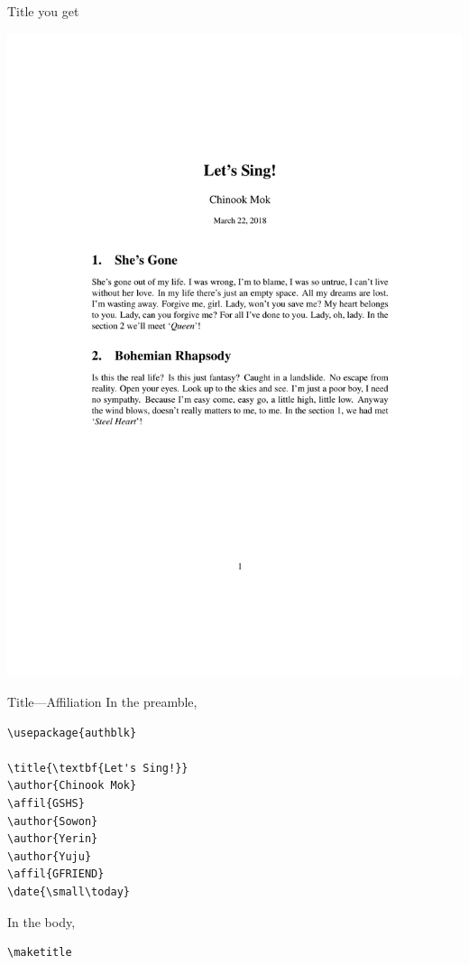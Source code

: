 \documentclass[12pt]{gshs_lecture}
\begin{document}
\begin{frame}[t]{Title}\small
you get
\begin{center}
\begin{framed}
\includegraphics[width=\textwidth,trim={0cm 13cm 0cm 4cm},clip]{./test_article/article007.pdf}
\end{framed}
\end{center}
\end{frame}

\begin{frame}[t,fragile]{Title---Affiliation}\small
In the preamble,
\begin{block}{}
\begin{lstlisting}
\usepackage{authblk}

\title{\textbf{Let's Sing!}}
\author{Chinook Mok}
\affil{GSHS}
\author{Sowon}
\author{Yerin}
\author{Yuju}
\affil{GFRIEND}
\date{\small\today}
\end{lstlisting}
\end{block}
In the body,
\begin{block}{}
\begin{lstlisting}
\maketitle
\end{lstlisting}
\end{block}
\end{frame}
\end{document}
